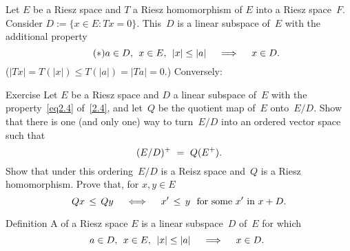 \documentclass[main.tex]{subfiles}
\begin{document}
%
%
\begin{psec}{2.4}%
Let $E$ be a Riesz space and $T$ a Riesz homomorphism of $E$
into a Riesz space~$F$.
Consider
 $D:=\{x\in E\colon Tx=0\}$.
This~$D$ is a linear subspace of~$E$ 
with the additional property
\begin{equation}
\tag{$*$}
\label{eq2.4}
a\in D\text{, }\; x\in E\text{, }\; |x|\leq |a| 
  \quad \implies \quad x\in D\text{. }
\end{equation}
($|Tx|=T(|x|)\leq T(|a|)=|Ta|=0$.)  
Conversely:
\end{psec}
%
%
\begin{psec}{2.5}{Exercise}
Let $E$ be a Riesz space and $D$ a linear subspace of~$E$
with the property~\eqref{eq2.4} of~\ref{2.4},
and let~$Q$ be the quotient map of~$E$ onto~$E/D$.
Show that there is one (and only one) way to turn~$E/D$
into an ordered vector space such that
\begin{equation*}
(E/D)^+ \ =\ Q(E^+)\text{.}
\end{equation*}
Show that under this ordering~$E/D$
is a Reisz space and~$Q$ is a Riesz homomorphism.
Prove that, for $x,y\in E$
\begin{equation*}
Qx\,\leq\,Qy\quad\iff \quad x'\,\leq\,y\ 
\htam{ for some }x'\htam{ in }x+D\htam{.}
\end{equation*}
\end{psec}
%
%
\begin{psec}{2.6}{Definition}
A  of a Riesz space $E$ 
is a linear subspace~$D$ of~$E$ for which
\begin{equation*}
a\in D\text{, }\; x\in E\text{, }\; |x|\leq |a| 
  \quad \implies \quad x\in D\text{. }
\end{equation*}
\end{psec}
\end{document}
